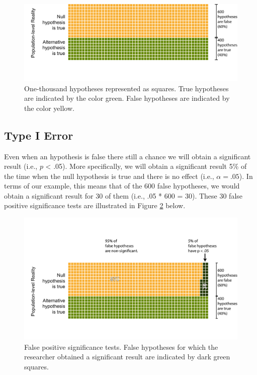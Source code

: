 \documentclass[
]{krantz}
\begin{document}
\begin{figure}
\includegraphics[width=0.9\linewidth]{ch_ppv/images/fig1} \caption[One-thousand hypotheses represented as squares.]{One-thousand hypotheses represented as squares. True hypotheses are indicated by the color green. False hypotheses are indicated by the color yellow.}\label{fig:ppvfig1}
\end{figure}

\hypertarget{type-i-error}{%
\subsection{Type I Error}\label{type-i-error}}

Even when an hypothesis is false there still a chance we will obtain a significant result (i.e., \(p\) \textless{} .05). More specifically, we will obtain a significant result 5\% of the time when the null hypothesis is true and there is no effect (i.e., \(\alpha = .05\)). In terms of our example, this means that of the 600 false hypotheses, we would obtain a significant result for 30 of them (i.e., .05 * 600 = 30). These 30 false positive significance tests are illustrated in Figure \ref{fig:ppvfig2} below.

\begin{figure}
\includegraphics[width=0.9\linewidth]{ch_ppv/images/fig2} \caption[False positive significance tests.]{False positive significance tests. False hypotheses for which the researcher obtained a significant result are indicated by dark green squares.}\label{fig:ppvfig2}
\end{figure}
\end{document}
